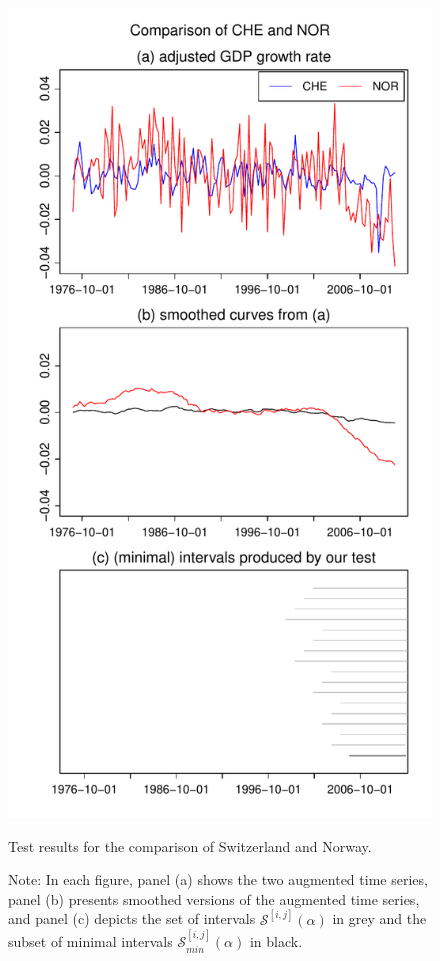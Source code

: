 \documentclass[a4paper,12pt]{article}
\begin{document}
\begin{figure}[t!]
\begin{minipage}[t]{0.49\textwidth}
\includegraphics[width=\textwidth]{output/plots/gdp/CHE_vs_NOR}
\caption{Test results for the comparison of Switzerland and Norway.}\label{fig:Switzerland:Norway}
\end{minipage}
\caption*{Note: In each figure, panel (a) shows the two augmented time series, panel (b) presents smoothed versions of the augmented time series, and panel (c) depicts the set of intervals $\mathcal{S}^{[i, j]}(\alpha)$ in grey and the subset of minimal intervals $\mathcal{S}^{[i, j]}_{min}(\alpha)$ in black.}
\end{figure}
\end{document}
